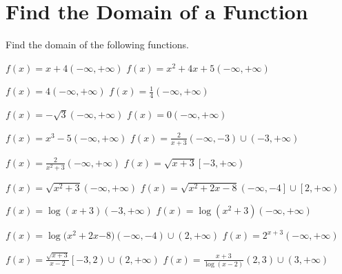 \section{Find the Domain of a Function}
Find the domain of the following functions.

\pairofprobsans%
{$\displaystyle f\left(x\right)=x+4$}{$\displaystyle \left(-\infty, +\infty\right)$}
{$\displaystyle f\left(x\right)=x^2+4x + 5$}{$\displaystyle \left(-\infty, +\infty\right) $}

\pairofprobsans%
{$\displaystyle f\left(x\right)=4$}{$\displaystyle \left(-\infty, +\infty\right)$}
{$\displaystyle f\left(x\right)=\frac{1}{4}$}{$\displaystyle \left(-\infty, +\infty\right)$}

\pairofprobsans%
{$\displaystyle f\left(x\right)=-\sqrt{3}$}{$\displaystyle \left(-\infty, +\infty\right)$}
{$\displaystyle f\left(x\right)=0$}{$\displaystyle \left(-\infty, +\infty\right)$}

\pairofprobsans%
{$\displaystyle f\left(x\right)=x^3 - 5$}{$\displaystyle \left(-\infty, +\infty\right)$}
{$\displaystyle f\left(x\right)=\frac{2}{x+3}$}{$\displaystyle \left(-\infty, -3\right) \cup \left(-3, +\infty\right)$}

\pairofprobsans%
{$\displaystyle f\left(x\right)=\frac{2}{x^2+3}$}{$\displaystyle \left(-\infty, +\infty\right)$}
{$\displaystyle f\left(x\right)=\sqrt{x+3}$}{$\displaystyle \left[-3, +\infty\right)$}

\newpage

\pairofprobsans%
{$\displaystyle f\left(x\right)=\sqrt{x^2+3}$}{$\displaystyle \left(-\infty, +\infty\right)$}
{$\displaystyle f\left(x\right)=\sqrt{x^2+2x-8}$}{$\displaystyle \left(-\infty, -4\right] \cup \left[2, +\infty\right)$}

\pairofprobsans%
{$\displaystyle f\left(x\right)=\log{(x+3)}$}{$\displaystyle \left(-3, +\infty\right)$}
{$\displaystyle f\left(x\right)=\log{\left(x^2+3\right)}$}{$\displaystyle \left(-\infty, +\infty\right)$}

\pairofprobsans%
{$f\left(x\right)=\log{(x^2+2x}$$-8)$}{$\displaystyle \left(-\infty, -4\right) \cup \left(2, +\infty\right)$}
{$\displaystyle f\left(x\right)=2^{x+3}$}{$\displaystyle \left(-\infty, +\infty\right)$}

\pairofprobsans%
{$\displaystyle f\left(x\right)=\frac{\sqrt{x + 3}}{x-2}$}{$\displaystyle \left[-3, 2\right) \cup \left(2, +\infty\right)$}
{$\displaystyle f\left(x\right)=\frac{x + 3}{\log{(x-2)}}$}{$\displaystyle \left(2, 3\right) \cup \left(3, +\infty\right)$}

